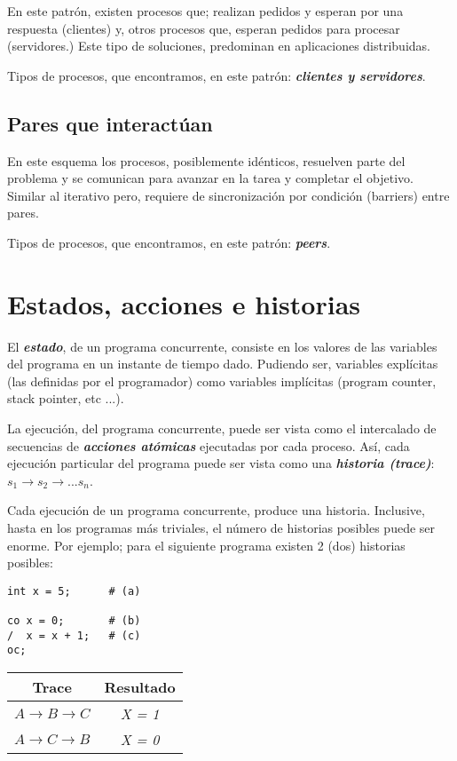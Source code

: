 \documentclass[a4paper, 10pt]{report}
\begin{document}
En este patrón, existen procesos que; realizan pedidos y esperan por una respuesta (clientes) y, otros procesos que, esperan pedidos para procesar (servidores.) Este tipo de soluciones, predominan en aplicaciones distribuidas.

Tipos de procesos, que encontramos, en este patrón: \textbf{\emph{clientes y servidores}}.

\subsection{Pares que interactúan}

En este esquema los procesos, posiblemente idénticos, resuelven parte del problema y se comunican para avanzar en la tarea y completar el objetivo.
Similar al iterativo pero, requiere de sincronización por condición (barriers) entre pares.

Tipos de procesos, que encontramos, en este patrón: \textbf{\emph{peers}}.

\section{Estados, acciones e historias}

El \textbf{\emph{estado}}, de un programa concurrente, consiste en los valores de las variables del programa en un instante de tiempo dado. Pudiendo ser, variables explícitas (las definidas por el programador) como variables implícitas (program counter, stack pointer, etc ...).

La ejecución, del programa concurrente, puede ser vista como el intercalado de secuencias de \textbf{\emph{acciones atómicas}} ejecutadas por cada proceso. Así, cada ejecución particular del programa puede ser vista como una \textbf{\emph{historia (trace)}}: $s_1 \rightarrow s_2 \rightarrow ... s_n$.

Cada ejecución de un programa concurrente, produce una historia. Inclusive, hasta en los programas más triviales, el número de historias posibles puede ser enorme. Por ejemplo; para el siguiente programa existen 2 (dos) historias posibles: 

\begin{multicols}{2}

\begin{lstlisting}
int x = 5;      # (a)

co x = 0;       # (b)
/  x = x + 1;   # (c)
oc;
\end{lstlisting}
\columnbreak
{\renewcommand{\arraystretch}{2}%
\centering
\begin{tabular}{cc}
	\textbf{Trace} & \textbf{Resultado}\\
	\hline 
	$A \rightarrow B \rightarrow C$ & \emph{X = 1}\\ 
	$A \rightarrow C \rightarrow B$ & \emph{X = 0}\\ 
\end{tabular}}
\end{multicols}
\end{document}
